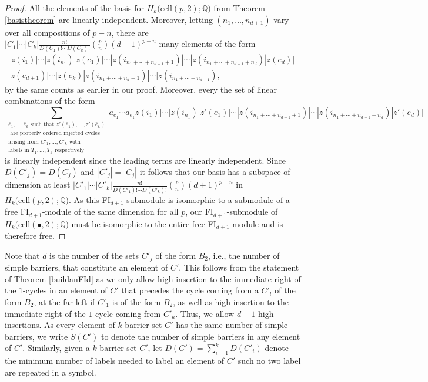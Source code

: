 \documentclass[12py]{amsart}%
\theoremstyle{definition}\newtheorem{definition}[thm]{Definition}
\theoremstyle{definition}
\newcommand{\Q}{\ensuremath{\mathbb{Q}}}
\begin{document}
\begin{proof}
All the elements of the basis for $H_{k}\big(\text{cell}(p,2);\Q\big)$ from Theorem \ref{basistheorem} are linearly independent. Moreover, letting $(n_{1},\dots, n_{d+1})$ vary over all compositions of $p-n$, there are $|C_{1}|\cdots|C_{k}|\frac{n!}{D(C_{1})!\cdots D(C_{k})!}\binom{p}{n}(d+1)^{p-n}$ many elements of the form
\begin{multline*}
z(i_{1})|\cdots|z(i_{n_{1}})|z(e_{1})|\cdots|z(i_{n_{1}+\cdots+n_{d-1}+1})|\cdots|z(i_{n_{1}+\cdots+n_{d-1}+n_{d}})|z(e_{d})|\\
z(e_{d+1})|\cdots|z(e_{k})|z(i_{n_{1}+\cdots+n_{d}+1})|\cdots|z(i_{n_{1}+\cdots+n_{d+1}}),
\end{multline*}
by the same counts as earlier in our proof. Moreover, every the set of linear combinations of the form
\[
\sum_{\substack{\bar{e}_{1},\dots, \bar{e}_{k}\text{ such that } z'(\bar{e}_{1}),\dots, z'(\bar{e}_{k})\\\text{ are properly ordered injected cycles }\\\text{arising from } C'_{1},\dots, C'_{k} \text{ with}\\\text{labels in }T_{1},\dots, T_{k}\text{ respectively}}}a_{\bar{e}_{1}}\cdots a_{\bar{e}_{1}}z(i_{1})|\cdots|z(i_{n_{1}})|z'(\bar{e}_{1})|\cdots|z(i_{n_{1}+\cdots+n_{d-1}+1})|\cdots|z(i_{n_{1}+\cdots+n_{d-1}+n_{d}})|z'(\bar{e}_{d})|
\]
is linearly independent since the leading terms are linearly independent. Since $D(C'_{j})=D(C_{j})$ and $|C'_{j}|=|C_{j}|$ it follows that our basis has a subspace of dimension at least $|C'_{1}|\cdots|C'_{k}|\frac{n!}{D(C'_{1})!\cdots D(C'_{k})!}\binom{p}{n}(d+1)^{p-n}$ in $H_{k}\big(\text{cell}(p, 2);\Q\big)$. As this FI$_{d+1}$-submodule is isomorphic to a submodule of a free FI$_{d+1}$-module of the same dimension for all $p$, our FI$_{d+1}$-submodule of $H_{k}\big(\text{cell}(\bullet, 2);\Q\big)$ must be isomorphic to the entire free FI$_{d+1}$-module and is therefore free.
\end{proof}

Note that $d$ is the number of the sets $C'_{j}$ of the form $B_{2}$, i.e., the number of simple barriers, that constitute an element of $C'$. This follows from the statement of Theorem \ref{buildanFId} as we only allow high-insertion to the immediate right of the $1$-cycles in an element of $C'$ that precedes the cycle coming from a $C'_{l}$ of the form $B_{2}$, at the far left if $C'_{1}$ is of the form $B_{2}$, as well as high-insertion to the immediate right of the $1$-cycle coming from $C'_{k}$. Thus, we allow $d+1$ high-insertions. As every element of $k$-barrier set $C'$ has the same number of simple barriers, we write $S(C')$ to denote the number of simple barriers in any element of $C'$. Similarly, given a $k$-barrier set $C'$, let $D(C')=\sum_{i=1}^{k}D(C'_{i})$ denote the minimum number of labels needed to label an element of $C'$ such no two label are repeated in a symbol. 
\end{document}
